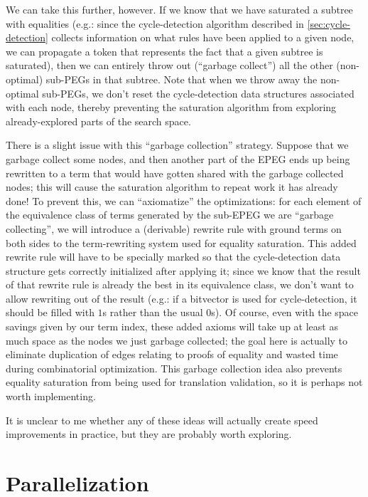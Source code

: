 \documentclass[11pt]{report}
\begin{document}
We can take this further, however. If we know that we have saturated a subtree
with equalities (e.g.: since the cycle-detection algorithm described in
\autoref{sec:cycle-detection} collects information on what rules have been
applied to a given node, we can propagate a token that represents the fact that
a given subtree is saturated), then we can entirely throw out (``garbage
collect'') all the other (non-optimal) sub-PEGs in that subtree. Note that when
we throw away the non-optimal sub-PEGs, we don't reset the cycle-detection
data structures associated with each node, thereby preventing the saturation
algorithm from exploring already-explored parts of the search space.

There is a slight issue with this ``garbage collection'' strategy. Suppose that
we garbage collect some nodes, and then another part of the EPEG ends up being
rewritten to a term that would have gotten shared with the garbage collected
nodes; this will cause the saturation algorithm to repeat work it has already
done! To prevent this, we can ``axiomatize'' the optimizations: for each element
of the equivalence class of terms generated by the sub-EPEG we are ``garbage
collecting'', we will introduce a (derivable) rewrite rule with ground terms on
both sides to the term-rewriting system used for equality saturation.
This added rewrite rule will have to be specially marked so that the
cycle-detection data structure gets correctly initialized after applying
it; since we know that the result of that rewrite rule is already the best in
its equivalence class, we don't want to allow rewriting out of the result
(e.g.: if a bitvector is used for cycle-detection, it should be filled with $1$s
rather than the usual $0$s). Of course, even with the space savings given
by our term index, these added axioms will take up at least as much space as the
nodes we just garbage collected; the goal here is actually to eliminate
duplication of edges relating to proofs of equality and wasted time during
combinatorial optimization. This garbage collection idea also prevents
equality saturation from being used for translation validation, so it is perhaps
not worth implementing.

It is unclear to me whether any of these ideas will actually create speed
improvements in practice, but they are probably worth exploring.

\section{Parallelization}
\label{sec:parallelization}
\end{document}
